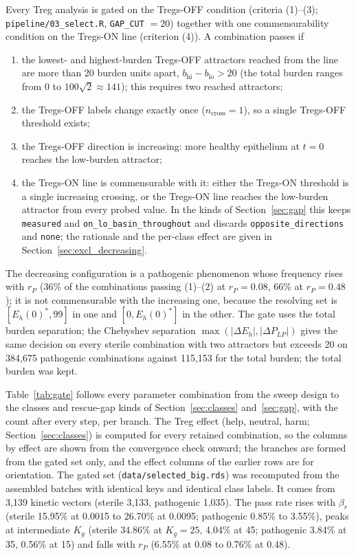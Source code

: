 \documentclass[11pt]{article}
\newcommand{\bros}{\beta_r}
\begin{document}
Every Treg analysis is gated on the Tregs-OFF condition (criteria (1)--(3);
\texttt{pipeline/03\_select.R}, \texttt{GAP\_CUT} $= 20$) together with one
commensurability condition on the Tregs-ON line (criterion (4)). A combination passes if
\begin{enumerate}
\item the lowest- and highest-burden Tregs-OFF attractors reached from the line are more
  than 20 burden units apart, $b_{\mathrm{hi}} - b_{\mathrm{lo}} > 20$ (the total burden
  ranges from 0 to $100\sqrt2 \approx 141$); this requires two reached attractors;
\item the Tregs-OFF labels change exactly once ($n_{\mathrm{cross}} = 1$), so a single
  Tregs-OFF threshold exists;
\item the Tregs-OFF direction is increasing: more healthy epithelium at $t = 0$ reaches
  the low-burden attractor;
\item the Tregs-ON line is commensurable with it: either the Tregs-ON threshold is a
  single increasing crossing, or the Tregs-ON line reaches the low-burden attractor from
  every probed value. In the kinds of Section~\ref{sec:gap} this keeps \texttt{measured}
  and \texttt{on\_lo\_basin\_throughout} and discards \texttt{opposite\_directions} and
  \texttt{none}; the rationale and the per-class effect are given in
  Section~\ref{sec:excl_decreasing}.
\end{enumerate}
The decreasing configuration is a pathogenic phenomenon whose frequency rises with $r_P$
(36\% of the combinations passing (1)--(2) at $r_P = 0.08$, 66\% at $r_P = 0.48$);
it is not commensurable with the increasing one, because the resolving
set is $[E_h(0)^*, 99]$ in one and $[0, E_h(0)^*]$ in the other. The gate uses the
total burden separation; the Chebyshev separation $\max(|\Delta E_h|, |\Delta P_{LP}|)$
gives the same decision on every sterile combination with two attractors but exceeds 20
on 384,675 pathogenic combinations against 115,153 for the total burden; the total burden was kept.

Table~\ref{tab:gate} follows every parameter combination from the sweep design to the
classes and rescue-gap kinds of Section~\ref{sec:classes} and~\ref{sec:gap}, with the
count after every step, per branch. The Treg effect (help, neutral, harm;
Section~\ref{sec:classes}) is computed for every retained combination, so the columns
by effect are shown from the convergence check onward; the branches are formed from
the gated set only, and the effect columns of the earlier rows are for orientation.
The gated set (\texttt{data/selected\_big.rds}) was recomputed from the assembled
batches with identical keys and identical class labels. It comes from
3{,}139 kinetic vectors (sterile 3{,}133, pathogenic 1{,}035). The pass rate rises with
$\bros$ (sterile 15.95\% at 0.0015 to 26.70\% at 0.0095; pathogenic 0.85\% to 3.55\%),
peaks at intermediate $K_g$ (sterile 34.86\% at $K_g = 25$, 4.04\% at 45; pathogenic
3.84\% at 35, 0.56\% at 15) and falls with $r_P$ (6.55\% at 0.08 to 0.76\% at 0.48).
\end{document}
